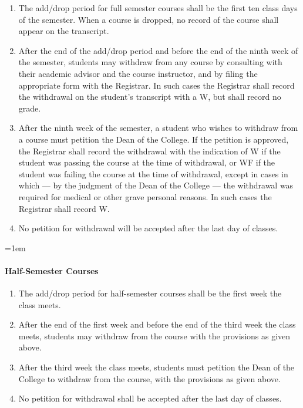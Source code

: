 \documentclass{manual}
\let\oldparagraph\paragraph
\renewcommand\paragraph{\leftskip=1em\oldparagraph}
\newcommand{\itemLevelA}{\alph*.}
\newcommand{\itemRefA}{\alph*}
\begin{document}
				\begin{enumerate}[label=\itemLevelA,ref=\itemRefA]
				\item The add/drop period for full semester courses shall be the first ten class days of the semester. When a course is dropped, no record of the course shall appear on the transcript.
				\item After the end of the add/drop period and before the end of the ninth  week of the semester, students may withdraw from any course by consulting with their academic advisor and the course instructor, and by filing the appropriate form with the Registrar. In such cases the Registrar shall record the withdrawal on the student's transcript with a W, but shall record no grade.
				\item After the ninth week of the semester, a student who wishes to withdraw from a course must petition the Dean of the College. If the petition is approved, the Registrar shall record the withdrawal with the indication of W if the student was passing the course at the time of withdrawal, or WF if the student was failing the course at the time of withdrawal, except in cases in which --- by the judgment of the Dean of the College --- the withdrawal was required for medical or other grave personal reasons. In such cases the Registrar shall record W.
				\item No petition for withdrawal will be accepted after the last day of classes. 
				\end{enumerate}

			\paragraph{Half-Semester Courses} 

				\begin{enumerate}[label=\itemLevelA,ref=\itemRefA]
				\item The add/drop period for half-semester courses shall be the first week the class meets.
				\item After the end of the first week and before the end of the third week the class meets, students may withdraw from the course with the provisions as given above.
				\item  After the third week the class meets, students must petition the Dean of the College to withdraw from the course, with the provisions as given above.
				\item No petition for withdrawal shall be accepted after the last day of classes. 
				\end{enumerate}
\end{document}
